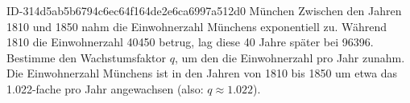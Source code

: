 \begin{exercise}
      {ID-314d5ab5b6794c6ec64f164de2e6ca6997a512d0}
      {München}
  \ifproblem\problem
    Zwischen den Jahren 1810 und 1850 nahm die Einwohnerzahl Münchens
    exponentiell zu. Während 1810 die Einwohnerzahl \num{40450} betrug,
    lag diese 40 Jahre später bei \num{96396}. Bestimme den Wachstumsfaktor
    $q$, um den die Einwohnerzahl pro Jahr zunahm.
  \fi
  \ifoutcome\outcome
    Die Einwohnerzahl Münchens ist in den Jahren von 1810 bis
    1850 um etwa das \num{1.022}-fache pro Jahr angewachsen
    (also: $q\approx\num{1.022}$).
  \fi
\end{exercise}

